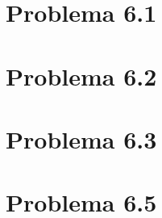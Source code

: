 \section{Problema 6.1}\label{problema6_1}

\newpage

\section{Problema 6.2}

\newpage

\section{Problema 6.3}

\newpage

%

\section{Problema 6.5}

